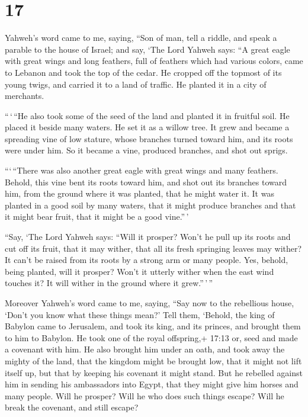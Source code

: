 \hypertarget{section-15}{%
\section{17}\label{section-15}}

 Yahweh's word came to me, saying,  ``Son of
man, tell a riddle, and speak a parable to the house of Israel;
 and say, `The Lord Yahweh says: ``A great eagle with great
wings and long feathers, full of feathers which had various colors, came
to Lebanon and took the top of the cedar.  He cropped off
the topmost of its young twigs, and carried it to a land of traffic. He
planted it in a city of merchants.

 ``\,`\,``He also took some of the seed of the land and
planted it in fruitful soil. He placed it beside many waters. He set it
as a willow tree.  It grew and became a spreading vine of
low stature, whose branches turned toward him, and its roots were under
him. So it became a vine, produced branches, and shot out sprigs.

 ```\,``There was also another great eagle with great wings
and many feathers. Behold, this vine bent its roots toward him, and shot
out its branches toward him, from the ground where it was planted, that
he might water it.  It was planted in a good soil by many
waters, that it might produce branches and that it might bear fruit,
that it might be a good vine.''\,'

 ``Say, `The Lord Yahweh says: ``Will it prosper? Won't he
pull up its roots and cut off its fruit, that it may wither, that all
its fresh springing leaves may wither? It can't be raised from its roots
by a strong arm or many people.  Yes, behold, being
planted, will it prosper? Won't it utterly wither when the east wind
touches it? It will wither in the ground where it grew.''\,'\,''

 Moreover Yahweh's word came to me, saying, 
``Say now to the rebellious house, `Don't you know what these things
mean?' Tell them, `Behold, the king of Babylon came to Jerusalem, and
took its king, and its princes, and brought them to him to Babylon.
 He took one of the royal offspring,+ 17:13 or, seed and
made a covenant with him. He also brought him under an oath, and took
away the mighty of the land,  that the kingdom might be
brought low, that it might not lift itself up, but that by keeping his
covenant it might stand.  But he rebelled against him in
sending his ambassadors into Egypt, that they might give him horses and
many people. Will he prosper? Will he who does such things escape? Will
he break the covenant, and still escape?


